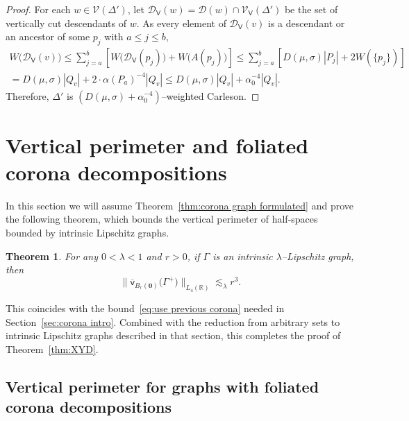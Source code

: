 \documentclass[11pt,reqno]{amsart}
\newcommand{\R}{\mathbb{R}}
\newcommand{\cD}{\mathcal{D}}
\newcommand{\cV}{\mathcal{V}}
\newcommand{\0}{\mathbf{0}}
\renewcommand{\1}{\mathbf 1}
\renewcommand{\le}{\leqslant}
\newtheorem{thm}{Theorem}[section]
\theoremstyle{remark}
\newcommand{\vpfl}[1]{{\overline{\mathsf{v}}_{\!#1}}}
\newcommand{\cDv}{{\mathcal{D}_{\mathsf{V}}}}
\newcommand{\cVv}{{\mathcal{V}_{\mathsf{V}}}}
\begin{document}
\begin{proof}
  For each $w\in \cV(\Delta')$, let $\cDv(w)=\cD(w)\cap \cVv(\Delta')$ be the set of vertically cut descendants of $w$.
 As every element of $\cDv(v)$ is a descendant or an ancestor of some $p_j$ with $a\le j\le b$,
  \begin{multline*}
    W\big(\cDv(v)\big)
    \le \sum_{j=a}^b \left[W\big(\cDv(p_j)\big) + W\big(A(p_j)\big)\right] \le \sum_{j=a}^b \left[ D(\mu,\sigma) |P_j| + 2W(\{p_j\}) \right] \\
    = D(\mu,\sigma) |Q_v| + 2\cdot \alpha(P_a)^{-4} |Q_v|
    \le D(\mu,\sigma) |Q_v| + \alpha_0^{-4} |Q_v|.
  \end{multline*}
  Therefore, $\Delta'$ is $\left(D(\mu,\sigma)+\alpha_0^{-4}\right)$--weighted Carleson.
\end{proof}
\section{Vertical perimeter and foliated corona decompositions}\label{sec:fcd bounds vper}
In this section we will assume Theorem~\ref{thm:corona graph formulated} and prove the following theorem, which bounds the vertical perimeter of half-spaces bounded by intrinsic Lipschitz graphs.
\begin{thm}\label{thm:fcd bounds vper} For any $0<\lambda<1$ and $r>0$, if $\Gamma$ is an intrinsic $\lambda$--Lipschitz graph, then
  $$\big\|\vpfl{B_r(\0)}\big(\Gamma^+\big)\big\|_{L_4(\R)}\lesssim_{\lambda} r^3.$$
\end{thm}
This coincides with the bound~\eqref{eq:use previous corona} needed in Section~\ref{sec:corona intro}.  Combined with the reduction from arbitrary sets to intrinsic Lipschitz graphs described in that section, this completes the proof of Theorem~\ref{thm:XYD}.

\subsection{Vertical perimeter for graphs with foliated corona decompositions}
\end{document}
